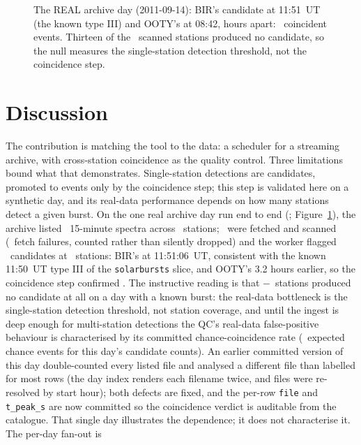 \documentclass[twocolumn]{aastex631}
\newcommand{\code}[1]{\texttt{#1}}
\begin{document}
\begin{figure}
\caption{The REAL archive day (2011-09-14): BIR's candidate at 11:51~UT (the known type III)
and OOTY's at 08:42, hours apart: \ecRealNevents\ coincident events. Thirteen of the
\ecRealNstationsScanned\ scanned stations produced no candidate, so the null measures the
single-station detection threshold, not the coincidence step.}
\label{fig:ecreal}
\end{figure}

\section{Discussion}
The contribution is matching the tool to the data: a scheduler for a streaming archive, with
cross-station coincidence as the quality control. Three limitations bound what that
demonstrates. Single-station detections are candidates, promoted to events only by the
coincidence step; this step is validated here on a synthetic day, and its real-data performance
depends on how many stations detect a given burst. On the one real archive day run end to end
(\ecRealSource; Figure~\ref{fig:ecreal}), the archive listed \ecRealNfilesListed\ 15-minute
spectra across \ecRealNstationsScanned\ stations; \ecRealNscanned\ were fetched and scanned
(\ecRealNfetchFailed\ fetch failures, counted rather than silently dropped) and the worker
flagged \ecRealNbursts\ candidates at \ecRealNcandStations\ stations: BIR's at 11:51:06~UT, consistent with the known 11:50~UT type III of the \code{solarbursts} slice, and OOTY's 3.2 hours earlier, so the coincidence step confirmed \ecRealNevents. The instructive
reading is that \ecRealNstationsScanned$-$\ecRealNcandStations\ stations produced no candidate
at all on a day with a known burst: the real-data bottleneck is the single-station detection
threshold, not station coverage, and until the ingest is deep enough for multi-station
detections the QC's real-data false-positive behaviour is characterised by its committed
chance-coincidence rate (\ecRealChanceEvents\ expected chance events for this day's candidate
counts). An earlier committed version of this day double-counted every listed file and analysed
a different file than labelled for most rows (the day index renders each filename twice, and
files were re-resolved by start hour); both defects are fixed, and the per-row \code{file} and
\code{t\_peak\_s} are now committed so the coincidence verdict is auditable from the
catalogue. That single day illustrates the dependence; it does not characterise it. The per-day fan-out is
\end{document}
